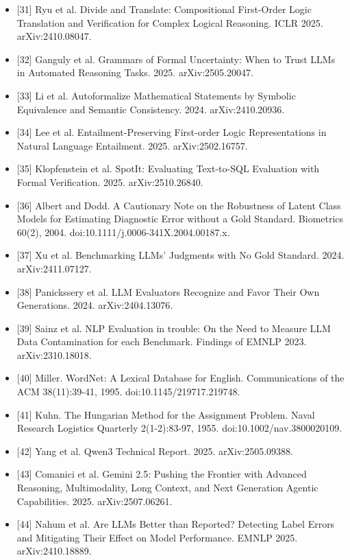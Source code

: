 \documentclass[11pt,letterpaper]{article}
\begin{document}
\begin{itemize}
\item {}[31] Ryu et al. Divide and Translate: Compositional First-Order Logic Translation and Verification for Complex Logical Reasoning. ICLR 2025. arXiv:2410.08047.
\item {}[32] Ganguly et al. Grammars of Formal Uncertainty: When to Trust LLMs in Automated Reasoning Tasks. 2025. arXiv:2505.20047.
\item {}[33] Li et al. Autoformalize Mathematical Statements by Symbolic Equivalence and Semantic Consistency. 2024. arXiv:2410.20936.
\item {}[34] Lee et al. Entailment-Preserving First-order Logic Representations in Natural Language Entailment. 2025. arXiv:2502.16757.
\item {}[35] Klopfenstein et al. SpotIt: Evaluating Text-to-SQL Evaluation with Formal Verification. 2025. arXiv:2510.26840.
\item {}[36] Albert and Dodd. A Cautionary Note on the Robustness of Latent Class Models for Estimating Diagnostic Error without a Gold Standard. Biometrics 60(2), 2004. doi:10.1111/j.0006-341X.2004.00187.x.
\item {}[37] Xu et al. Benchmarking LLMs' Judgments with No Gold Standard. 2024. arXiv:2411.07127.
\item {}[38] Panickssery et al. LLM Evaluators Recognize and Favor Their Own Generations. 2024. arXiv:2404.13076.
\item {}[39] Sainz et al. NLP Evaluation in trouble: On the Need to Measure LLM Data Contamination for each Benchmark. Findings of EMNLP 2023. arXiv:2310.18018.
\item {}[40] Miller. WordNet: A Lexical Database for English. Communications of the ACM 38(11):39-41, 1995. doi:10.1145/219717.219748.
\item {}[41] Kuhn. The Hungarian Method for the Assignment Problem. Naval Research Logistics Quarterly 2(1-2):83-97, 1955. doi:10.1002/nav.3800020109.
\item {}[42] Yang et al. Qwen3 Technical Report. 2025. arXiv:2505.09388.
\item {}[43] Comanici et al. Gemini 2.5: Pushing the Frontier with Advanced Reasoning, Multimodality, Long Context, and Next Generation Agentic Capabilities. 2025. arXiv:2507.06261.
\item {}[44] Nahum et al. Are LLMs Better than Reported? Detecting Label Errors and Mitigating Their Effect on Model Performance. EMNLP 2025. arXiv:2410.18889.
\end{itemize}
\end{document}
